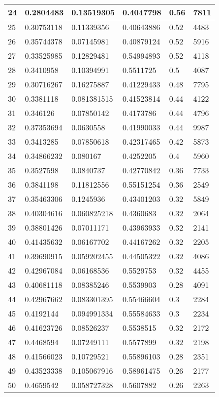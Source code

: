 \begin{longtable}{|l|l|l|l|l|l|}
24 & 0.2804483 & 0.13519305 & 0.4047798 & 0.56 & 7811 \\ \hline 
25 & 0.30753118 & 0.11339356 & 0.40643886 & 0.52 & 4483 \\ \hline 
26 & 0.35744378 & 0.07145981 & 0.40879124 & 0.52 & 5916 \\ \hline 
27 & 0.33525985 & 0.12829481 & 0.54994893 & 0.52 & 4118 \\ \hline 
28 & 0.3410958 & 0.10394991 & 0.5511725 & 0.5 & 4087 \\ \hline 
29 & 0.30716267 & 0.16275887 & 0.41229433 & 0.48 & 7795 \\ \hline 
30 & 0.3381118 & 0.081381515 & 0.41523814 & 0.44 & 4122 \\ \hline 
31 & 0.346126 & 0.07850142 & 0.4173786 & 0.44 & 4796 \\ \hline 
32 & 0.37353694 & 0.0630558 & 0.41990033 & 0.44 & 9987 \\ \hline 
33 & 0.3413285 & 0.07850618 & 0.42317465 & 0.42 & 5873 \\ \hline 
34 & 0.34866232 & 0.080167 & 0.4252205 & 0.4 & 5960 \\ \hline 
35 & 0.3527598 & 0.0840737 & 0.42770842 & 0.36 & 7733 \\ \hline 
36 & 0.3841198 & 0.11812556 & 0.55151254 & 0.36 & 2549 \\ \hline 
37 & 0.35463306 & 0.1245936 & 0.43401203 & 0.32 & 5849 \\ \hline 
38 & 0.40304616 & 0.060825218 & 0.4360683 & 0.32 & 2064 \\ \hline 
39 & 0.38801426 & 0.07011171 & 0.43963933 & 0.32 & 2141 \\ \hline 
40 & 0.41435632 & 0.06167702 & 0.44167262 & 0.32 & 2205 \\ \hline 
41 & 0.39690915 & 0.059202455 & 0.44505322 & 0.32 & 4086 \\ \hline 
42 & 0.42967084 & 0.06168536 & 0.5529753 & 0.32 & 4455 \\ \hline 
43 & 0.40681118 & 0.08385246 & 0.5539903 & 0.28 & 4091 \\ \hline 
44 & 0.42967662 & 0.083301395 & 0.55466604 & 0.3 & 2284 \\ \hline 
45 & 0.4192144 & 0.094991334 & 0.55584633 & 0.3 & 2234 \\ \hline 
46 & 0.41623726 & 0.08526237 & 0.5538515 & 0.32 & 2172 \\ \hline 
47 & 0.4468594 & 0.07249111 & 0.5577899 & 0.32 & 2198 \\ \hline 
48 & 0.41566023 & 0.10729521 & 0.55896103 & 0.28 & 2351 \\ \hline 
49 & 0.43523338 & 0.105067916 & 0.58961475 & 0.26 & 2177 \\ \hline 
50 & 0.4659542 & 0.058727328 & 0.5607882 & 0.26 & 2263 \\ \hline 
\end{longtable}